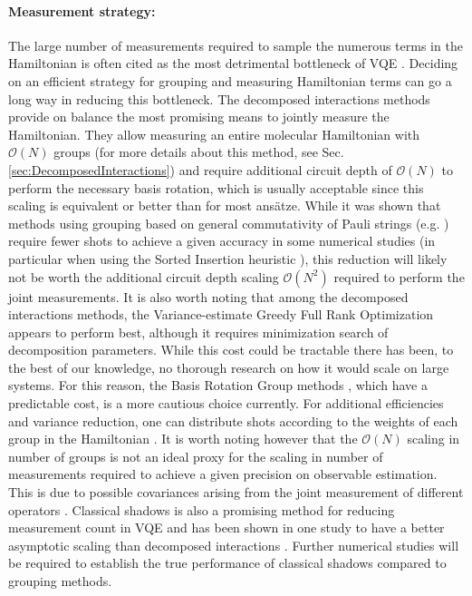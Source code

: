 \paragraph{Measurement strategy:} The large number of measurements required to sample the numerous terms in the Hamiltonian is often cited as the most detrimental bottleneck of VQE \cite{Wecker2015, Elfving2020, Gonthier2020}. Deciding on an efficient strategy for grouping and measuring Hamiltonian terms can go a long way in reducing this bottleneck. The decomposed interactions methods \cite{Huggins2021, Yen2021_Cartan} provide on balance the most promising means to jointly measure the Hamiltonian. They allow measuring an entire molecular Hamiltonian with $\mathcal{O}(N)$ groups (for more details about this method, see Sec. \ref{sec:DecomposedInteractions}) and require additional circuit depth of $\mathcal{O}(N)$ to perform the necessary basis rotation, which is usually acceptable since this scaling is equivalent or better than for most ans{\"{a}}tze. While it was shown that methods using grouping based on general commutativity of Pauli strings (e.g. \cite{Gokhale2019_short, Hamamura2020}) require fewer shots to achieve a given accuracy \cite{Yen2021_Cartan} in some numerical studies (in particular when using the Sorted Insertion heuristic \cite{Crawford2021}), this reduction will likely not be worth the additional circuit depth scaling $\mathcal{O}(N^2)$ \cite{Gokhale2019_long} required to perform the joint measurements. It is also worth noting that among the decomposed interactions methods, the Variance-estimate Greedy Full Rank Optimization \cite{Yen2021_Cartan} appears to perform best, although it requires minimization search of decomposition parameters. While this cost could be tractable there has been, to the best of our knowledge, no thorough research on how it would scale on large systems. For this reason, the Basis Rotation Group methods \cite{Huggins2021}, which have a predictable cost, is a more cautious choice currently. For additional efficiencies and variance reduction, one can distribute shots according to the weights of each group in the Hamiltonian \cite{Wecker2015, Rubin2018,Arrasmith2020}. It is worth noting however that the $\mathcal{O}(N)$ scaling in number of groups is not an ideal proxy for the scaling in number of measurements required to achieve a given precision on observable estimation. This is due to possible covariances arising from the joint measurement of different operators \cite{mccleanTheoryVariationalHybrid2015}. Classical shadows \cite{Huang2020} is also a promising method for reducing measurement count in VQE and has been shown in one study to have a better asymptotic scaling than decomposed interactions \cite{OBrien2021}. Further numerical studies will be required to establish the true performance of classical shadows compared to grouping methods.  

